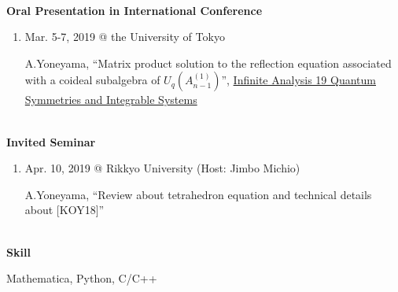 \documentclass[dvipdfmx]{jsarticle}
\begin{document}
%
%
%
%
{\ }\\
\vspace{3mm}
{\bf\large Oral Presentation in International Conference}
\vspace{-6mm}
\\\hrulefill
\begin{enumerate}
\item
Mar. 5-7, 2019 @ the University of Tokyo
\par
A.Yoneyama, ``Matrix product solution to the reflection equation associated with a coideal subalgebra of $U_q(A_{n-1}^{(1)})$'', \href{https://sites.google.com/view/ia19/home}{Infinite Analysis 19 Quantum Symmetries and Integrable Systems}
\end{enumerate}
%
%
%
%
{\ }\\
\vspace{3mm}
{\bf\large Invited Seminar}
\vspace{-6mm}
\\\hrulefill
\begin{enumerate}
\item
Apr. 10, 2019 @ Rikkyo University (Host: Jimbo Michio)
\par
A.Yoneyama, ``Review about tetrahedron equation and technical details about [KOY18]''
\end{enumerate}
%
%
%
%
{\ }\\
\vspace{3mm}
{\bf\large Skill}
\vspace{-6mm}
\\\hrulefill
\par
Mathematica, Python, C/C++
%
%
%
%
\end{document}

